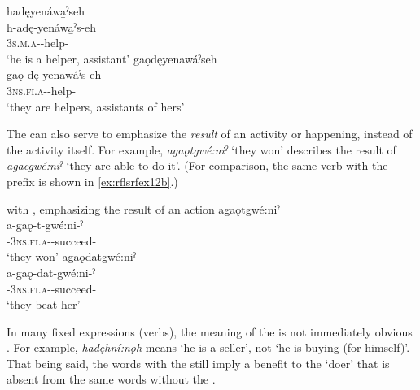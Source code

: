 \ea\label{ex:rflsrfex22} 
\ea hadęyenáwa̱ˀseh\\
\gll h-adę-yenáwa̱ˀs-eh\\
 \textsc{3s.m.a}-{\semireflexive}-help-{\habitual}\\
\glt `he is a helper, assistant'
\ex gaǫdęyenawáˀseh\\
\gll gaǫ-dę-yenawáˀs-eh\\
 \textsc{3ns.fi.a}-{\semireflexive}-help-{\habitual}\\
\glt `they are helpers, assistants of hers'
\z
\z

The  \textsc{\semireflexive} can also serve to emphasize the \emph{result} of an activity or happening, instead of the activity itself. For example, \textit{agaǫtgwé:niˀ} ‘they won’  describes the result of \textit{agaegwé:niˀ} ‘they are able to do it’. (For comparison, the same verb with the  {} prefix is shown in \ref{ex:rflsrfex12b}.)

\ea\label{ex:rflsrfex12} with , emphasizing the result of an action
\ea\label{ex:rflsrfex12a} agaǫtgwé:niˀ\\
\gll a-gaǫ-t-gwé:ni-ˀ\\
 {\factual}-\textsc{3ns.fi.a}-{\semireflexive}-succeed-{\punctual}\\
\glt `they won'
\ex agaǫdatgwé:niˀ\\\label{ex:rflsrfex12b}
\gll a-gaǫ-dat-gwé:ni-ˀ\\
 {\factual}-\textsc{3ns.fi.a}-{}-succeed-{\punctual}\\
\glt `they beat her'
\z
\z

In many fixed expressions (verbs), the meaning of the  \textsc{\semireflexive} is not immediately obvious . For example, \textit{hadęhní:nǫh} means ‘he is a seller’, not ‘he is buying (for himself)’. That being said, the words with the  {\semireflexive} still imply a benefit to the ‘doer’ that is absent from the same words without the  {\semireflexive}.
	
